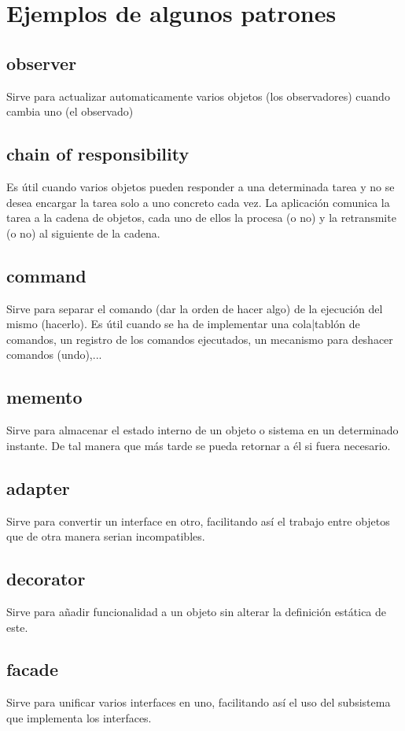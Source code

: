\documentclass[spanish,12pt,a4paper,final,oneside]{book}
\begin{document}
\section{Ejemplos de algunos patrones}
\subsection{observer}
Sirve para actualizar automaticamente varios objetos (los observadores)  cuando cambia uno (el observado)
\subsection{chain of responsibility}
Es útil cuando varios objetos pueden responder a una determinada tarea y no se desea encargar la tarea solo a uno concreto cada vez. La aplicación comunica la tarea a la cadena de objetos, cada uno de ellos la procesa (o no) y la retransmite (o no) al siguiente de la cadena.
\subsection{command}
Sirve para separar el comando (dar la orden de hacer algo) de la ejecución del mismo (hacerlo). Es útil cuando se ha de implementar una cola|tablón de comandos, un registro de los comandos ejecutados, un mecanismo para deshacer comandos (undo),...
\subsection{memento}
Sirve para almacenar el estado interno de un objeto o sistema en un determinado instante. De tal manera que más tarde se pueda retornar a él si fuera necesario.
\subsection{adapter}
Sirve para convertir un interface en otro, facilitando así el trabajo entre objetos que de otra manera serian incompatibles. 
\subsection{decorator}
Sirve para añadir funcionalidad a un objeto sin alterar la definición estática de este.
\subsection{facade}
Sirve para unificar varios interfaces en uno, facilitando así el uso del subsistema que implementa los interfaces.
\end{document}
